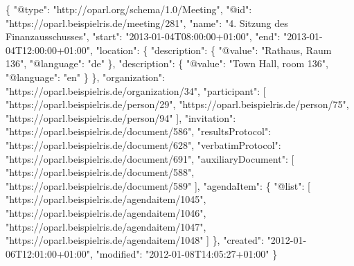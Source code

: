 \documentclass[,a4paper]{article}
\newenvironment{Shaded}{}{}
\newcommand{\DataTypeTok}[1]{\textcolor[rgb]{0.56,0.13,0.00}{{#1}}}
\newcommand{\StringTok}[1]{\textcolor[rgb]{0.25,0.44,0.63}{{#1}}}
\newcommand{\OtherTok}[1]{\textcolor[rgb]{0.00,0.44,0.13}{{#1}}}
\newcommand{\FunctionTok}[1]{\textcolor[rgb]{0.02,0.16,0.49}{{#1}}}
\begin{document}
\begin{Shaded}
\begin{Highlighting}[]
\FunctionTok{\{}
    \DataTypeTok{"@type"}\FunctionTok{:} \StringTok{"http://oparl.org/schema/1.0/Meeting"}\FunctionTok{,}
    \DataTypeTok{"@id"}\FunctionTok{:} \StringTok{"https://oparl.beispielris.de/meeting/281"}\FunctionTok{,}
    \DataTypeTok{"name"}\FunctionTok{:} \StringTok{"4. Sitzung des Finanzausschusses"}\FunctionTok{,}
    \DataTypeTok{"start"}\FunctionTok{:} \StringTok{"2013-01-04T08:00:00+01:00"}\FunctionTok{,}
    \DataTypeTok{"end"}\FunctionTok{:} \StringTok{"2013-01-04T12:00:00+01:00"}\FunctionTok{,}
    \DataTypeTok{"location"}\FunctionTok{:} \FunctionTok{\{}
        \DataTypeTok{"description"}\FunctionTok{:} \FunctionTok{\{}
            \DataTypeTok{"@value"}\FunctionTok{:} \StringTok{"Rathaus, Raum 136"}\FunctionTok{,}
            \DataTypeTok{"@language"}\FunctionTok{:} \StringTok{"de"}
        \FunctionTok{\},}
        \DataTypeTok{"description"}\FunctionTok{:} \FunctionTok{\{}
            \DataTypeTok{"@value"}\FunctionTok{:} \StringTok{"Town Hall, room 136"}\FunctionTok{,}
            \DataTypeTok{"@language"}\FunctionTok{:} \StringTok{"en"}
        \FunctionTok{\}}
    \FunctionTok{\},}
    \DataTypeTok{"organization"}\FunctionTok{:} \StringTok{"https://oparl.beispielris.de/organization/34"}\FunctionTok{,}
    \DataTypeTok{"participant"}\FunctionTok{:} \OtherTok{[}
        \StringTok{"https://oparl.beispielris.de/person/29"}\OtherTok{,}
        \StringTok{"https://oparl.beispielris.de/person/75"}\OtherTok{,}
        \StringTok{"https://oparl.beispielris.de/person/94"}
    \OtherTok{]}\FunctionTok{,}
    \DataTypeTok{"invitation"}\FunctionTok{:} \StringTok{"https://oparl.beispielris.de/document/586"}\FunctionTok{,}
    \DataTypeTok{"resultsProtocol"}\FunctionTok{:} \StringTok{"https://oparl.beispielris.de/document/628"}\FunctionTok{,}
    \DataTypeTok{"verbatimProtocol"}\FunctionTok{:} \StringTok{"https://oparl.beispielris.de/document/691"}\FunctionTok{,}
    \DataTypeTok{"auxiliaryDocument"}\FunctionTok{:} \OtherTok{[}
        \StringTok{"https://oparl.beispielris.de/document/588"}\OtherTok{,}
        \StringTok{"https://oparl.beispielris.de/document/589"}
    \OtherTok{]}\FunctionTok{,}
    \DataTypeTok{"agendaItem"}\FunctionTok{:} \FunctionTok{\{}
        \DataTypeTok{"@list"}\FunctionTok{:} \OtherTok{[}
            \StringTok{"https://oparl.beispielris.de/agendaitem/1045"}\OtherTok{,}
            \StringTok{"https://oparl.beispielris.de/agendaitem/1046"}\OtherTok{,}
            \StringTok{"https://oparl.beispielris.de/agendaitem/1047"}\OtherTok{,}
            \StringTok{"https://oparl.beispielris.de/agendaitem/1048"}
        \OtherTok{]}
    \FunctionTok{\},}
    \DataTypeTok{"created"}\FunctionTok{:} \StringTok{"2012-01-06T12:01:00+01:00"}\FunctionTok{,}
    \DataTypeTok{"modified"}\FunctionTok{:} \StringTok{"2012-01-08T14:05:27+01:00"}
\FunctionTok{\}}
\end{Highlighting}
\end{Shaded}
\end{document}
